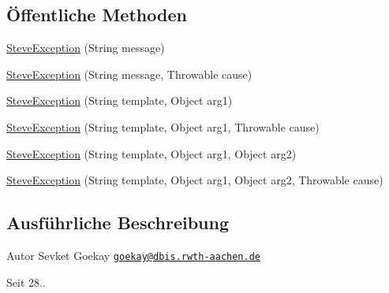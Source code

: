 \subsection*{Öffentliche Methoden}
\begin{DoxyCompactItemize}
\item 
\hyperlink{classde_1_1rwth_1_1idsg_1_1steve_1_1_steve_exception_a60678566b5bc3dc292dfdc0dab7f9b52}{Steve\-Exception} (String message)
\item 
\hyperlink{classde_1_1rwth_1_1idsg_1_1steve_1_1_steve_exception_a5b5e6f2373fe77dcdc3524e8345e2444}{Steve\-Exception} (String message, Throwable cause)
\item 
\hyperlink{classde_1_1rwth_1_1idsg_1_1steve_1_1_steve_exception_a12e0dc4e53a14e837c1d55d4cc74013b}{Steve\-Exception} (String template, Object arg1)
\item 
\hyperlink{classde_1_1rwth_1_1idsg_1_1steve_1_1_steve_exception_af538eab03d9be9e9ef03fb7d88350494}{Steve\-Exception} (String template, Object arg1, Throwable cause)
\item 
\hyperlink{classde_1_1rwth_1_1idsg_1_1steve_1_1_steve_exception_a747b28e34863586991cc9dc2907a22b1}{Steve\-Exception} (String template, Object arg1, Object arg2)
\item 
\hyperlink{classde_1_1rwth_1_1idsg_1_1steve_1_1_steve_exception_a808ddf40f0b83ea373337ccfe152de67}{Steve\-Exception} (String template, Object arg1, Object arg2, Throwable cause)
\end{DoxyCompactItemize}


\subsection{Ausführliche Beschreibung}
\begin{DoxyAuthor}{Autor}
Sevket Goekay \href{mailto:goekay@dbis.rwth-aachen.de}{\tt goekay@dbis.\-rwth-\/aachen.\-de} 
\end{DoxyAuthor}
\begin{DoxySince}{Seit}
28.. 
\end{DoxySince}


